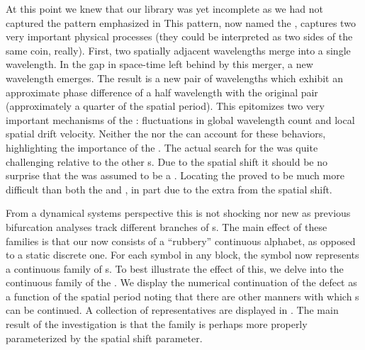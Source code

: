 At this point we knew that our library was yet incomplete as we had not
captured the pattern emphasized in %
This pattern, now named the {}, captures two very important physical processes (they
could be interpreted as two sides of the same coin, really). First, two spatially adjacent
wavelengths merge into a single wavelength. In the gap in space-time left behind by this
merger, a new wavelength emerges. The result is a new pair of wavelengths which
exhibit an approximate phase difference of a
half wavelength with the original pair (approximately a quarter of
the spatial period).
This {} epitomizes two very important mechanisms of the \KSe:
fluctuations in global wavelength count and local spatial drift velocity.
Neither the {\streak} nor the {\wiggle} can account for
these behaviors, highlighting the importance of the {}.
The actual search for the {} was quite challenging relative to the other
{\fpo}s. Due to the spatial
shift it should be no surprise that the {\fpo} was assumed to be a {\rpo}.
Locating the {} proved to be much more difficult than both the {\wiggle}
and {\streak}, in part due to the extra {\cdof} from the spatial shift.



From a dynamical systems perspective
this is not shocking nor new as previous bifurcation analyses
track different branches of {\po}s.
The main effect of these families is that our {\symbolic}
now consists of a ``rubbery'' continuous alphabet, as opposed to a static discrete one.
For each symbol in any {\spt} {block}, the symbol now represents a continuous
family of {\fpo}s. To best illustrate the effect of this,
we delve into the continuous family of the {}.
We display the numerical continuation of the defect as a
function of the spatial period noting
that there are other manners with which {\po}s can be continued. A collection of representatives
are displayed in {}. The main result of the investigation is
that the family is perhaps more properly parameterized
by the spatial shift parameter.

